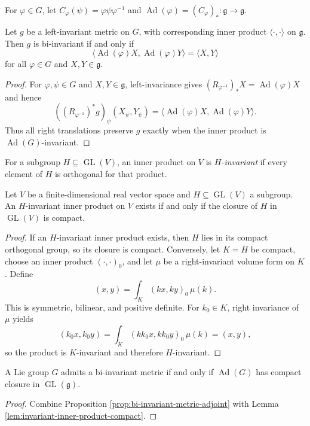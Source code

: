 For $\varphi\in G$, let $C_\varphi(\psi)=\varphi\psi\varphi^{-1}$ and
$\operatorname{Ad}(\varphi)=(C_\varphi)_*\colon\mathfrak g\to\mathfrak g$.

\begin{proposition}
\label{prop:bi-invariant-metric-adjoint}
Let $g$ be a left-invariant metric on $G$, with corresponding inner product
$\langle\cdot,\cdot\rangle$ on $\mathfrak g$. Then $g$ is bi-invariant if and
only if
\[
\langle\operatorname{Ad}(\varphi)X,\operatorname{Ad}(\varphi)Y\rangle
=\langle X,Y\rangle
\]
for all $\varphi\in G$ and $X,Y\in\mathfrak g$.
\end{proposition}
\begin{proof}
\sketch For $\varphi,\psi\in G$ and $X,Y\in\mathfrak g$, left-invariance gives
$(R_{\varphi^{-1}})_*X=\operatorname{Ad}(\varphi)X$ and hence
\[
((R_{\varphi^{-1}})^*g)_\psi(X_\psi,Y_\psi)
=\langle\operatorname{Ad}(\varphi)X,
\operatorname{Ad}(\varphi)Y\rangle.
\]
Thus all right translations preserve $g$ exactly when the inner product is
$\operatorname{Ad}(G)$-invariant.
\end{proof}

For a subgroup $H\subseteq\operatorname{GL}(V)$, an inner product on $V$ is
\emph{$H$-invariant} if every element of $H$ is orthogonal for that product.

\begin{lemma}
\label{lem:invariant-inner-product-compact}
Let $V$ be a finite-dimensional real vector space and
$H\subseteq\operatorname{GL}(V)$ a subgroup. An $H$-invariant inner product on
$V$ exists if and only if the closure of $H$ in $\operatorname{GL}(V)$ is
compact.
\end{lemma}
\begin{proof}
\sketch If an $H$-invariant inner product exists, then $H$ lies in its compact
orthogonal group, so its closure is compact. Conversely, let $K=\overline H$ be
compact, choose an inner product $(\cdot,\cdot)_0$, and let $\mu$ be a
right-invariant volume form on $K$. Define
\[
(x,y)=\int_K(kx,ky)_0\,\mu(k).
\]
This is symmetric, bilinear, and positive definite. For $k_0\in K$, right
invariance of $\mu$ yields
\[
(k_0x,k_0y)=\int_K(kk_0x,kk_0y)_0\,\mu(k)=(x,y),
\]
so the product is $K$-invariant and therefore $H$-invariant.
\end{proof}

\begin{theorem}
\label{thm:existence-bi-invariant-metrics}
A Lie group $G$ admits a bi-invariant metric if and only if
$\operatorname{Ad}(G)$ has compact closure in
$\operatorname{GL}(\mathfrak g)$.
\end{theorem}
\begin{proof}
\sketch Combine Proposition \ref{prop:bi-invariant-metric-adjoint} with Lemma
\ref{lem:invariant-inner-product-compact}.
\end{proof}

